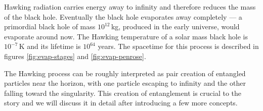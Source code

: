Hawking radiation carries energy away to infinity and therefore reduces the mass of the black hole. Eventually the black hole evaporates away completely --- a primordial black hole of mass $10^{12}\,$kg, produced in the early universe, would evaporate around now. The Hawking temperature of a solar mass black hole is $10^{-7}\,$K and its lifetime is $10^{64}$ years. 
The spacetime for this process is described in figures \ref{fig:evap-stages} and \ref{fig:evap-penrose}.


The Hawking process can be roughly interpreted as pair creation of entangled particles near the horizon, with one particle escaping to infinity and the other falling toward the singularity. This creation of entanglement is crucial to the story and we will discuss it in detail after introducing a few more concepts.


